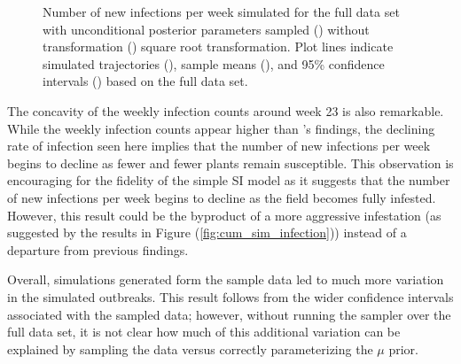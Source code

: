 \documentclass{uwstat572}
\newcommand{\greyline}{\raisebox{2pt}{\tikz{\draw[-,gray,solid,line width = 1.5pt](0,0) -- (8mm,0);}}}
\newcommand{\blackline}{\raisebox{2pt}{\tikz{\draw[-,black,solid,line width = 1.5pt](0,0) -- (8mm,0);}}}
\newcommand{\blackdashline}{\raisebox{2pt}{\tikz{\draw[-,black,dashed,line width = 1.5pt](0,0) -- (8mm,0);}}}
\begin{document}
\begin{figure}[!b]
\begin{subfigure}[b]{0.49\textwidth}
		\caption{}
		\label{fig:root_all_infections}
	\end{subfigure}
	\caption{Number of new infections per week simulated for the full data set with unconditional posterior parameters sampled () without transformation () square root transformation. Plot lines indicate simulated trajectories (\protect\greyline), sample means (\protect\blackline), and 95\% confidence intervals (\protect\blackdashline) based on the full data set. }
	\label{fig:full_field_sim}
\end{figure} 
The concavity of the weekly infection counts around week 23 is also remarkable. 
While the weekly infection counts appear higher than \citet{Brown}'s findings, the declining rate of infection seen here implies that the number of new infections per week begins to decline as fewer and fewer plants remain susceptible. 
This observation is encouraging for the fidelity of the simple SI model as it suggests that the number of new infections per week begins to decline as the field becomes fully infested. 
However, this result could be the byproduct of a more aggressive infestation (as suggested by the results in Figure (\ref{fig:cum_sim_infection})) instead of a departure from previous findings. 

Overall, simulations generated form the sample data led to much more variation in the simulated outbreaks. 
This result follows from the wider confidence intervals associated with the sampled data; however, without running the sampler over the full data set, it is not clear how much of this additional variation can be explained by sampling the data versus correctly parameterizing the $\mu$ prior. 
\end{document}
